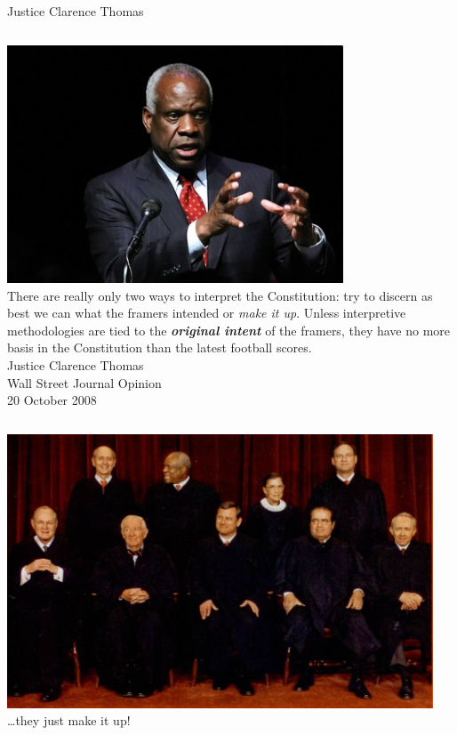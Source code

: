 \begin{frame}{Justice Clarence Thomas}
    \begin{columns}[onlytextwidth]
            \centering
            \includegraphics[width=0.75\textwidth]{img/clarence-thomas.png} \\
        There are really only two ways to interpret the Constitution: try to
        discern as best we can what the framers intended or \emph{make it up}.
        Unless interpretive methodologies are tied to the
        \textbf{\emph{original intent}} of the framers, they have no more basis
        in the Constitution than the latest football scores. \\
        \vspace{10pt}
        Justice Clarence Thomas \\ Wall Street Journal Opinion \\ 20 October 2008
    \end{columns}
\end{frame}

\begin{frame}
    \centering
    \includegraphics[width=0.95\textwidth]{img/thomas-breyer.jpg} \\
    \pause
    { \large \ldots they just make it up! } \\
\end{frame}

